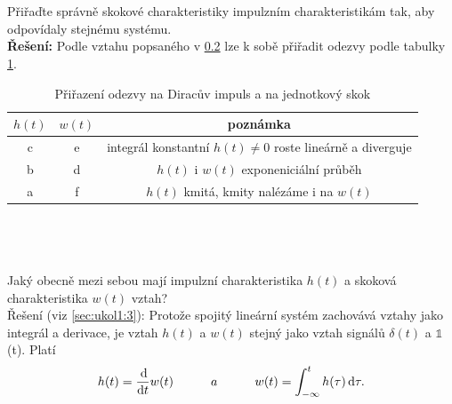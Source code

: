 \documentclass[twoside]{article}
\begin{document}
\subsection{~}
Přiřaďte správně skokové charakteristiky impulzním charakteristikám tak, aby odpovídaly stejnému systému. \\
\textbf{Řešení:} Podle vztahu popsaného v \ref{sec:ukol11:2} lze k sobě přiřadit odezvy podle tabulky \ref{tab:odezvy}.
\begin{table}[htbp]
	\centering
	\begin{tabular}{c|c|c}
		$h(t)$ & $w(t)$ & poznámka \\
		\hline
		c & e & integrál konstantní $h(t) \neq 0 $ roste lineárně a diverguje \\
		b & d & $h(t)$ i $w(t)$ exponeniciální průběh \\
		a & f & $h(t)$ kmitá, kmity nalézáme i na $w(t)$
	\end{tabular}
	\caption{Přiřazení odezvy na Diracův impuls a na jednotkový skok}
	\label{tab:odezvy}
\end{table} 

\subsection{~}
\label{sec:ukol11:2}
Jaký obecně mezi sebou mají impulzní charakteristika $h(t)$ a skoková charakteristika $w(t)$ vztah? \\
Řešení (viz \ref{sec:ukol1:3}): Protože spojitý lineární systém zachovává vztahy jako integrál a derivace,
je vztah $h(t)$ a $w(t)$ stejný jako vztah signálů $\delta(t)$ a $\mathbb{1}$(t). Platí
\begin{equation*}
	h(t) = \frac{\dif}{\dif t} w(t) ~~~~~~~~~ a ~~~~~~~~~ w(t) = \int_{-\infty}^{t} h(\tau) \dif \tau.
\end{equation*}
\end{document}
